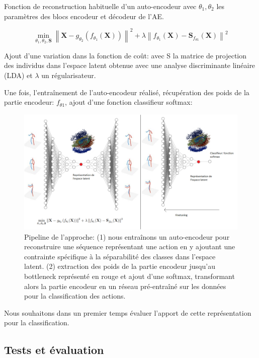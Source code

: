 Fonction de reconstruction habituelle d'un auto-encodeur avec $\theta_{1}, \theta_{2}$ les paramètres des blocs encodeur et décodeur de l’AE. 

$$\min _{\theta_{1}, \theta_{2}, \mathbf{S}}\left\|\mathbf{X}-g_{\theta_{2}}\left(f_{\theta_{1}}(\mathbf{X})\right)\right\|^{2}+\lambda\left\|f_{\theta_{1}}(\mathbf{X})-\mathbf{S}_{f_{\theta 1}}(\mathbf{X})\right\|^{2}$$

Ajout d'une variation dans la fonction de coût: avec S la matrice de projection des individus dans l'espace latent obtenue avec une analyse discriminante linéaire (LDA) et $\lambda$ un régularisateur.

Une fois, l’entraînement de l’auto-encodeur réalisé, récupération des poids de la partie encodeur: $f_{\theta 1}$, ajout d'une fonction classifieur softmax:\\ 


\begin{figure}[H]
    \includegraphics[width=1.1\linewidth]{Images/AE_supervis.png}
    \caption{Pipeline de l'approche: (1) nous entraînons un auto-encodeur pour reconstruire une séquence représentant une action en y ajoutant une contrainte spécifique à la séparabilité des classes dans l'espace latent. (2) extraction des poids de la partie encodeur jusqu'au bottleneck représenté en rouge et ajout d'une softmax, transformant alors la partie encodeur en un réseau pré-entraîné sur les données pour la classification des actions.}
    \label{fig:AEmodif}
\end{figure}

Nous souhaitons dans un premier temps évaluer l'apport de cette représentation pour la classification.

\subsection{Tests et évaluation}

